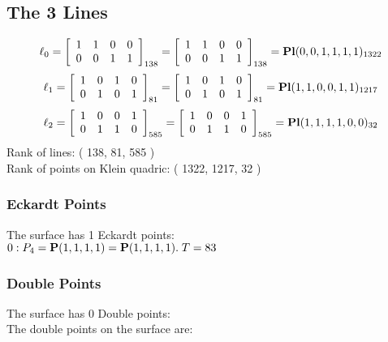 \documentclass{article}
\newcommand{\bP}{{\bf P}}
\begin{document}
{\subsection*{The 3 Lines}
$$
\ell_{0} = 
\left[
\begin{array}{*{4}{r}}
1 & 1 & 0 & 0\\
0 & 0 & 1 & 1\\
\end{array}
\right]
_{138}
=
\left[
\begin{array}{*{4}c}
1  & 1  & 0  & 0\\
0  & 0  & 1  & 1\\
\end{array}
\right]_{138}
={\rm\bf Pl}(0,0,1,1,1,1 )_{1322}$$
$$
\ell_{1} = 
\left[
\begin{array}{*{4}{r}}
1 & 0 & 1 & 0\\
0 & 1 & 0 & 1\\
\end{array}
\right]
_{81}
=
\left[
\begin{array}{*{4}c}
1  & 0  & 1  & 0\\
0  & 1  & 0  & 1\\
\end{array}
\right]_{81}
={\rm\bf Pl}(1,1,0,0,1,1 )_{1217}$$
$$
\ell_{2} = 
\left[
\begin{array}{*{4}{r}}
1 & 0 & 0 & 1\\
0 & 1 & 1 & 0\\
\end{array}
\right]
_{585}
=
\left[
\begin{array}{*{4}c}
1  & 0  & 0  & 1\\
0  & 1  & 1  & 0\\
\end{array}
\right]_{585}
={\rm\bf Pl}(1,1,1,1,0,0 )_{32}$$
Rank of lines: ( 138, 81, 585 )\\
Rank of points on Klein quadric: ( 1322, 1217, 32 )\\
\subsubsection*{Eckardt Points}
The surface has 1 Eckardt points:\\
$0 : P_{4}=\bP(1, 1, 1, 1) = \bP(1, 1, 1, 1).\; T= 83$\\
\subsubsection*{Double Points}
The surface has 0 Double points:\\
The double points on the surface are:\\
\begin{multicols}{2}
\noindent
\end{multicols}
}
\end{document}
